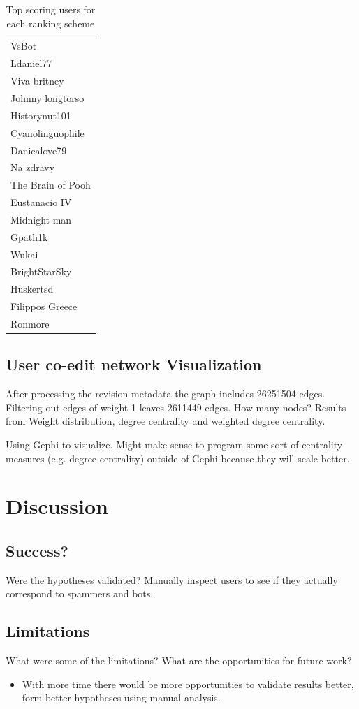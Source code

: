 \documentclass{article}
\begin{document}
\begin{landscape}
\begin{table}
\begin{center}
\begin{tabular}{l}
VsBot \\
Ldaniel77 \\
Viva britney \\
Johnny longtorso \\
Historynut101 \\
Cyanolinguophile \\
Danicalove79 \\
Na zdravy \\
The Brain of Pooh \\
Eustanacio IV \\
Midnight man \\
Gpath1k \\
Wukai \\
BrightStarSky \\
Huskertsd \\
Filippos Greece \\
Ronmore \\
\end{tabular}
\label{scorechart}
\caption{Top scoring users for each ranking scheme}
\end{center}
\end{table}
\end{landscape}

\subsection{User co-edit network Visualization}

After processing the revision metadata the graph includes 26251504 edges. Filtering out edges of weight 1 leaves 2611449 edges. How many nodes? Results from Weight distribution, degree centrality and weighted degree centrality.

Using Gephi to visualize. Might make sense to program some sort of centrality measures (e.g. degree centrality) outside of Gephi because they will scale better.

\section{Discussion}
\subsection{Success?}
Were the hypotheses validated? Manually inspect users to see if they actually correspond to spammers and bots.
\subsection{Limitations}
What were some of the limitations? What are the opportunities for future work?
\begin{itemize}
\item With more time there would be more opportunities to validate results better, form better hypotheses using manual analysis.
\end{itemize}
\end{document}
